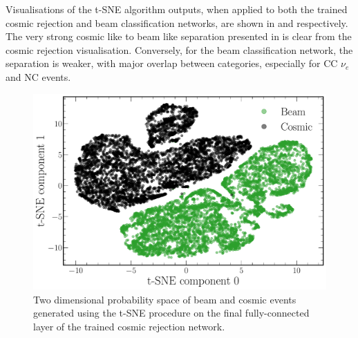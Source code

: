 Visualisations of the t-SNE algorithm outputs, when applied to both the trained cosmic rejection
and beam classification networks, are shown in  and
 respectively. The very strong cosmic like to beam like
separation presented in  is clear from the cosmic rejection
visualisation. Conversely, for the beam classification network, the separation is weaker, with
major overlap between categories, especially for CC $\nu_{e}$ and NC events.

\begin{figure} %
    \includegraphics[width=\textwidth]{diagrams/7-results/explain_cosmic_tsne.pdf}
    \caption[Cosmic rejection network output t-SNE space]
    {Two dimensional probability space of beam and cosmic events generated using the t-SNE
        procedure on the final fully-connected layer of the trained cosmic rejection network.}
    \label{fig:explain_cosmic_tsne}
\end{figure}

